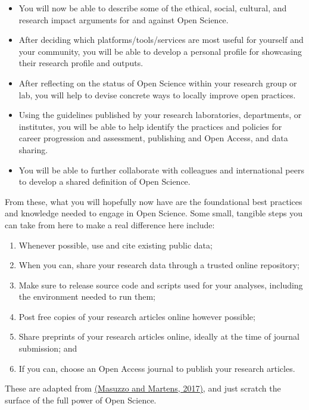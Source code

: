 \documentclass[]{book}
\begin{document}
\begin{itemize}
\item
  You will now be able to describe some of the ethical, social, cultural, and research impact arguments for and against Open Science.
\item
  After deciding which platforms/tools/services are most useful for yourself and your community, you will be able to develop a personal profile for showcasing their research profile and outputs.
\item
  After reflecting on the status of Open Science within your research group or lab, you will help to devise concrete ways to locally improve open practices.
\item
  Using the guidelines published by your research laboratories, departments, or institutes, you will be able to help identify the practices and policies for career progression and assessment, publishing and Open Access, and data sharing.
\item
  You will be able to further collaborate with colleagues and international peers to develop a shared definition of Open Science.
\end{itemize}

From these, what you will hopefully now have are the foundational best practices and knowledge needed to engage in Open Science. Some small, tangible steps you can take from here to make a real difference here include:

\begin{enumerate}
\def\labelenumi{\arabic{enumi}.}
\item
  Whenever possible, use and cite existing public data;
\item
  When you can, share your research data through a trusted online repository;
\item
  Make sure to release source code and scripts used for your analyses, including the environment needed to run them;
\item
  Post free copies of your research articles online however possible;
\item
  Share preprints of your research articles online, ideally at the time of journal submission; and
\item
  If you can, choose an Open Access journal to publish your research articles.
\end{enumerate}

These are adapted from \href{https://github.com/OpenScienceMOOC/Module-1-Open-Principles/blob/master/Reading\%20Material_Open\%20Principles/Masuzzo\%20and\%20Martens\%2C\%202017.pdf}{(Masuzzo and Martens, 2017)}, and just scratch the surface of the full power of Open Science.
\end{document}
